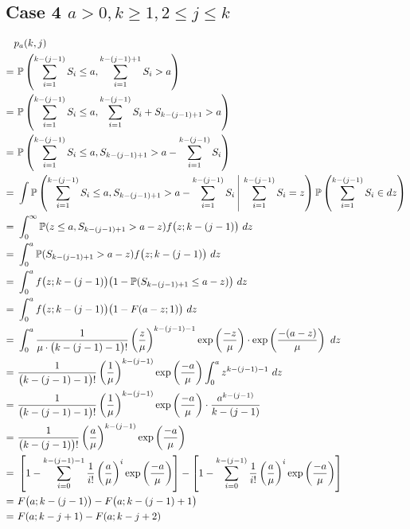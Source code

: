 \subsection{Case 4 $a > 0, k \geq 1, 2 \leq j \leq k$}
\begin{align*}
	& p_{a} (k, j) \\
	= & \ \mathbb{P} \left( \sum_{i = 1}^{k - (j - 1)} S_{i} \leq a, \sum_{i = 1}^{k - (j - 1) + 1} S_{i} > a \right) \\
	= & \ \mathbb{P} \left( \sum_{i = 1}^{k - (j - 1)} S_{i} \leq a, \sum_{i = 1}^{k - (j - 1)} S_{i} + S_{k - (j - 1) + 1} > a \right) \\
	= & \ \mathbb{P} \left( \sum_{i = 1}^{k - (j - 1)} S_{i} \leq a, S_{k - (j - 1) + 1} > a - \sum_{i = 1}^{k - (j - 1)} S_{i} \right) \\
	= & \ \int \mathbb{P} \left( \sum_{i = 1}^{k - (j - 1)} S_{i} \leq a, S_{k - (j - 1) + 1} > a - \sum_{i = 1}^{k - (j -1)} S_{i} \ \vline \ \sum_{i = 1}^{k - (j - 1)} S_{i} = z \right) \mathbb{P} \left( \sum_{i = 1}^{k - (j - 1)} S_{i} \in d z \right) \\
	= & \ \int_{0}^{\infty} \mathbb{P} (z \leq a, S_{k - (j - 1) + 1} > a - z) f \big( z; k - (j - 1) \big) \ d z \\
	= & \ \int_{0}^{a} \mathbb{P} (S_{k - (j - 1) + 1} > a - z) f \big( z; k - (j - 1) \big) \ d z \\
	= & \ \int_{0}^{a} f \big( z; k - (j - 1) \big) \big( 1 - \mathbb{P} (S_{k - (j - 1) + 1} \leq a - z) \big) \ d z \\
	= & \ \int_{0}^{a} f \big( z; k - (j - 1) \big) \big( 1 - F (a - z; 1) \big) \ d z \\
	= & \ \int_{0}^{a} \frac{1}{\mu \cdot \big( k - (j - 1) - 1 \big)!} \left( \frac{z}{\mu} \right)^{k - (j - 1) - 1} \exp \left( \frac{-z}{\mu} \right) \cdot \exp \left( \frac{- (a - z)}{\mu} \right) \ d z \\
	= & \ \frac{1}{\big( k - (j - 1) - 1 \big)!} \left( \frac{1}{\mu} \right)^{k - (j - 1)} \exp \left( \frac{- a}{\mu} \right) \int_{0}^{a} z^{k - (j - 1) - 1} \ d z \\
	= & \ \frac{1}{\big( k - (j - 1) - 1 \big)!} \left( \frac{1}{\mu} \right)^{k - (j - 1)} \exp \left( \frac{- a}{\mu} \right) \cdot \frac{a^{k - (j - 1)}}{k - (j - 1)} \\
	= & \ \frac{1}{\big( k - (j - 1) \big)!} \left( \frac{a}{\mu} \right)^{k - (j - 1)} \exp \left( \frac{- a}{\mu} \right) \\
	= & \ \left[ 1 - \sum_{i = 0}^{k - (j - 1) - 1} \frac{1}{i!} \left( \frac{a}{\mu} \right)^{i} \exp \left( \frac{- a}{\mu} \right) \right] - \left[ 1 - \sum_{i = 0}^{k - (j - 1)} \frac{1}{i!} \left( \frac{a}{\mu} \right)^{i} \exp \left( \frac{- a}{\mu} \right) \right] \\
	= & \ F \big( a; k - (j - 1) \big) - F \big( a; k - (j - 1) + 1 \big) \\
	= & \ F (a; k - j + 1) - F (a; k - j + 2)
\end{align*}

